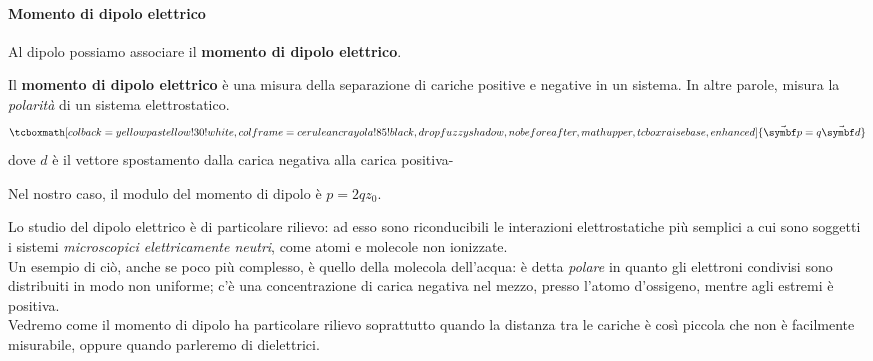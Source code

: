 \paragraph{Momento di dipolo elettrico}
Al dipolo possiamo associare il \textbf{momento di dipolo elettrico}.
\begin{define}
	Il \textbf{momento di dipolo elettrico} è una misura della separazione di cariche positive e negative in un sistema. In altre parole, misura la \textit{polarità} di un sistema elettrostatico.
	\begin{equation}
	\tcboxmath[colback=yellowpastellow!30!white,colframe=ceruleancrayola!85!black,drop fuzzy shadow, nobeforeafter, math upper, tcbox raise base, enhanced]{\vba{p}=q\vba{d}}
\end{equation}
dove $d$ è il vettore spostamento dalla carica negativa alla carica positiva-
\end{define}
Nel nostro caso, il modulo del momento di dipolo è $p=2qz_0$.
\begin{digression}
	Lo studio del dipolo elettrico è di particolare rilievo: ad esso sono riconducibili le interazioni elettrostatiche più semplici a cui sono soggetti i sistemi \textit{microscopici elettricamente neutri}, come atomi e molecole non ionizzate.\\
	Un esempio di ciò, anche se poco più complesso, è quello della molecola dell'acqua: è detta \textit{polare} in quanto gli elettroni condivisi sono distribuiti in modo non uniforme; c'è una concentrazione di carica negativa nel mezzo, presso l'atomo d'ossigeno, mentre agli estremi è positiva.\\
	Vedremo come il momento di dipolo ha particolare rilievo soprattutto quando la distanza tra le cariche è così piccola che non è facilmente misurabile, oppure quando parleremo di dielettrici.
\end{digression}
